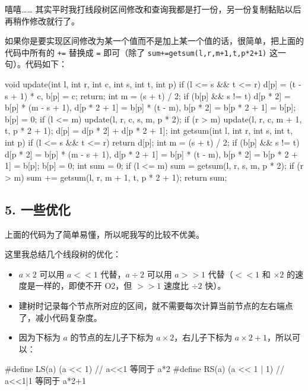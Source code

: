 嘻嘻…… 其实平时我打线段树区间修改和查询我都是打一份，另一份复制黏贴以后再稍作修改就行了。

如果你是要实现区间修改为某一个值而不是加上某一个值的话，很简单，把上面的代码中所有的 \texttt{+=} 替换成 \texttt{=} 即可（除了 \texttt{sum+=getsum(l,r,m+1,t,p*2+1)} 这一句）。代码如下：

\begin{cppcode}
void update(int l, int r, int c, int s, int t, int p) {
  if (l <= s && t <= r) {
    d[p] = (t - s + 1) * c, b[p] = c;
    return;
  }
  int m = (s + t) / 2;
  if (b[p] && s != t)
    d[p * 2] = b[p] * (m - s + 1), d[p * 2 + 1] = b[p] * (t - m),
          b[p * 2] = b[p * 2 + 1] = b[p];
  b[p] = 0;
  if (l <= m) update(l, r, c, s, m, p * 2);
  if (r > m) update(l, r, c, m + 1, t, p * 2 + 1);
  d[p] = d[p * 2] + d[p * 2 + 1];
}
int getsum(int l, int r, int s, int t, int p) {
  if (l <= s && t <= r) return d[p];
  int m = (s + t) / 2;
  if (b[p] && s != t)
    d[p * 2] = b[p] * (m - s + 1), d[p * 2 + 1] = b[p] * (t - m),
          b[p * 2] = b[p * 2 + 1] = b[p];
  b[p] = 0;
  int sum = 0;
  if (l <= m) sum = getsum(l, r, s, m, p * 2);
  if (r > m) sum += getsum(l, r, m + 1, t, p * 2 + 1);
  return sum;
}
\end{cppcode}

\subsection{5. 一些优化}

上面的代码为了简单易懂，所以呢我写的比较不优美。

这里我总结几个线段树的优化：

\begin{itemize}
\item $a\times 2$ 可以用 $a<<1$ 代替，$a\div 2$ 可以用 $a>>1$ 代替（$<<1$ 和 $\times 2$ 的速度是一样的，即使不开 O2，但 $>>1$ 速度比 $\div 2$ 快）。
\item 建树时记录每个节点所对应的区间，就不需要每次计算当前节点的左右端点了，减小代码复杂度。
\item 因为下标为 $a$ 的节点的左儿子下标为 $a\times 2$，右儿子下标为 $a\times 2+1$，所以可以：
\end{itemize}

\begin{cppcode}
#define LS(a) (a << 1)
// a<<1 等同于 a*2
#define RS(a) (a << 1 | 1)
// a<<1|1 等同于 a*2+1
\end{cppcode}

